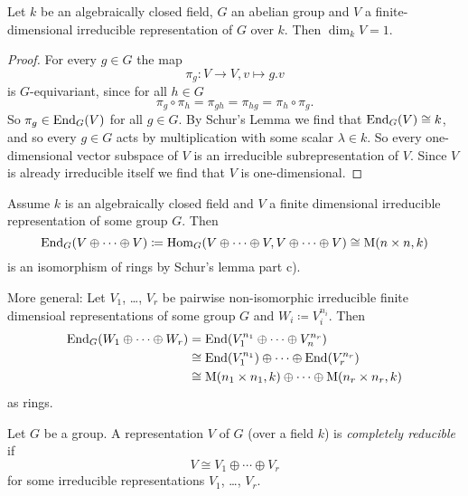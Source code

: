 \begin{cor}
  Let $k$ be an algebraically closed field, $G$ an abelian group and $V$ a finite-dimensional irreducible representation of $G$ over $k$.
  Then $\dim_k V = 1$.
\end{cor}
\begin{proof}
  For every $g \in G$ the map
  \[
            \pi_g
    \colon  V \to V,
            v
    \mapsto g.v
  \]
  is $G$-equivariant, since for all $h \in G$
  \[
      \pi_g \circ \pi_h
    = \pi_{gh}
    = \pi_{hg}
    = \pi_h \circ \pi_g.
  \]
  So $\pi_g \in \operatorname{End}_G(V)$ for all $g \in G$.
  By Schur’s Lemma we find that $\operatorname{End}_G(V) \cong k$, and so every $g \in G$ acts by multiplication with some scalar $\lambda \in k$.
  So every one-dimensional vector subspace of $V$ is an irreducible subrepresentation of $V$.
  Since $V$ is already irreducible itself we find that $V$ is one-dimensional.
\end{proof}


\begin{rem}
  Assume $k$ is an algebraically closed field and $V$ a finite dimensional irreducible representation of some group $G$.
  Then
  \[
              \operatorname{End}_G(V \oplus \dotsb \oplus V)
    \coloneqq \operatorname{Hom}_G(V \oplus \dotsb \oplus V, V \oplus \dotsb \oplus V)
    \cong     \operatorname{M}(n \times n, k)
  \]
  is an isomorphism of rings by Schur’s lemma part c).
  
  More general:
  Let $V_1$, \dots, $V_r$ be pairwise non-isomorphic irreducible finite dimensioal representations of some group $G$ and $W_i \coloneqq V_i^{n_i}$.
  Then
  \begin{align*}
            \operatorname{End}_G(W_1 \oplus \dotsb \oplus W_r)
    &=      \operatorname{End}(V_1^{n_1} \oplus \dotsb \oplus V_n^{n_r})
    \\
    &\cong  \operatorname{End}(V_1^{n_1}) \oplus \dotsb \oplus \operatorname{End}(V_r^{n_r})
    \\
    &\cong  \operatorname{M}(n_1 \times n_1, k) \oplus \dotsb \oplus \operatorname{M}(n_r \times n_r, k)
  \end{align*}
  as rings.
\end{rem}


\begin{defi}
  Let $G$ be a group.
  A representation $V$ of $G$ (over a field $k$) is \emph{completely reducible} if
  \[
          V
    \cong V_1 \oplus \dotsb \oplus V_r
  \]
  for some irreducible representations $V_1$, \dots, $V_r$.
\end{defi}


